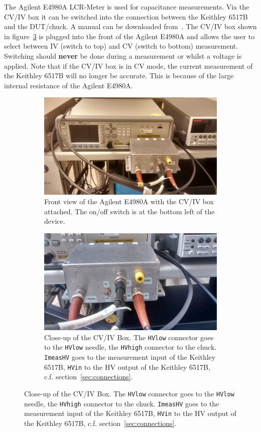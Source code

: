 \documentclass[a4paper]{article}
\begin{document}
The Agilent E4980A LCR-Meter is used for capacitance measurements.
Via the CV/IV box it can be switched into the connection between the Keithley 6517B and the DUT/chuck.
A manual can be downloaded from~\cite{ref:agilentref}.
The CV/IV box shown in figure~\ref{fig:cvivbox} is plugged into the front of the Agilent E4980A and allows the user to select between IV (switch to top) and CV (switch to bottom) measurement.
Switching should {\bf never} be done during a measurement or whilst a voltage is applied.
Note that if the CV/IV box is in CV mode, the current measurement of the Keithley 6517B will no longer be accurate.
This is because of the large internal resistance of the Agilent E4980A.\\

\begin{figure}[hbtp]
\centering
\begin{subfigure}[t]{0.475\textwidth}
\centering\captionsetup{width=.8\linewidth}%
\includegraphics[width=\linewidth]{pictures/front_agilent.jpg}
\caption[Front View of the Agilent E4980A]{Front view of the Agilent E4980A with the CV/IV box attached. The on/off switch is at the bottom left of the device.}
\label{fig:agilent}
\end{subfigure}
\begin{subfigure}[t]{0.475\textwidth}
\centering\captionsetup{width=.8\linewidth}%
\includegraphics[width=\linewidth]{pictures/cvivswitch.jpg}
\caption[The CV/IV Box]{Close-up of the CV/IV Box. The {\tt HVlow} connector goes to the {\tt HVlow} needle, the {\tt HVhigh} connector to the chuck. {\tt ImeasHV} goes to the measurement input of the Keithley 6517B, {\tt HVin} to the HV output of the Keithley 6517B, c.f. section~\ref{sec:connections}.}
\label{fig:cvivbox}
\end{subfigure}
\end{figure}
\end{document}
